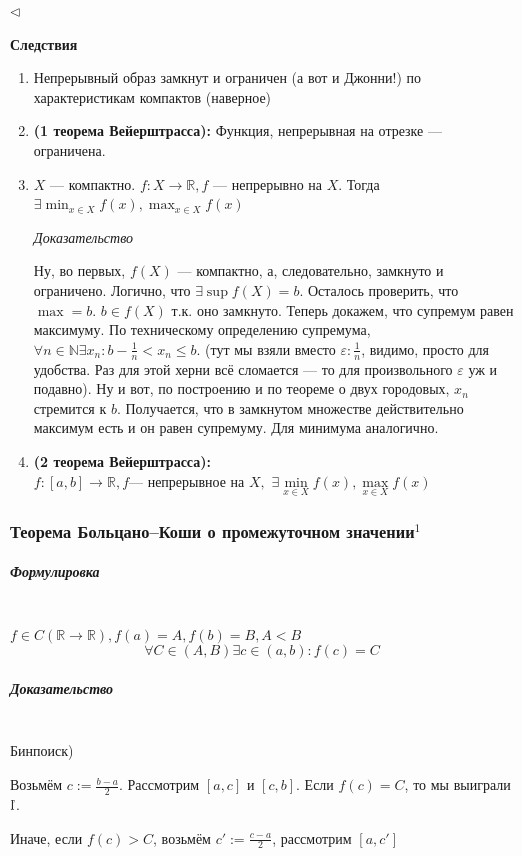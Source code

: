 \documentclass{article}
\def\dbl{\,\,}
\let\vanillasubparagraph\subparagraph
\renewcommand{\subparagraph}[1]{\vanillasubparagraph{#1}\mbox{}\\}
\begin{document}
$\lhd$

\textbf{Следствия}

\begin{enumerate}
    \item Непрерывный образ замкнут и ограничен (а вот и Джонни!) по характеристикам компактов (наверное)
    \item \textbf{(1 теорема Вейерштрасса): } Функция, непрерывная на отрезке --- ограничена.
    \item $X$ --- компактно. $f: X \rightarrow \mathbb{R}, f$ --- непрерывно на $X$. Тогда $\exists \min_{x \in X}{f(x)}, \max_{x \in X}{f(x)}$
    
    \textit{Доказательство}
    
    Ну, во первых, $f(X)$ --- компактно, а, следовательно, замкнуто и ограничено. Логично, что $\exists \sup f(X) = b$. Осталось проверить, что $\max = b$. $b \in f(X)$ т.к. оно замкнуто. Теперь докажем, что супремум равен максимуму. По техническому определению супремума, $\forall n \in \mathbb{N} \exists x_n : b - \frac{1}{n} < x_n \le b$. (тут мы взяли вместо $\varepsilon : \frac{1}{n}$, видимо, просто для удобства. Раз для этой херни всё сломается --- то для произвольного $\varepsilon$ уж и подавно). Ну и вот, по построению и по теореме о двух городовых, $x_n$ стремится к $b$. Получается, что в замкнутом множестве действительно максимум есть и он равен супремуму. Для минимума аналогично.
    
    \item \textbf{(2 теорема Вейерштрасса): }
    $f: [a, b] \rightarrow \mathbb{R}, f\text{--- непрерывное на }X,\dbl \exists \min\limits_{x \in X}{f(x)}, \max\limits_{x \in X}{f(x)}$
\end{enumerate}


\subsubsection{Теорема Больцано--Коши о промежуточном значении\texorpdfstring{$^1$}{}}
\subparagraph{Формулировка}
$f\in C(\mathbb{R} \rightarrow \mathbb{R}), f(a) = A, f(b) = B, A < B$
$$
\forall C \in (A, B) \exists c \in (a, b) : f(c) = C
$$

\subparagraph{Доказательство}
Бинпоиск)

Возьмём $c := \frac{b-a}{2}$. Рассмотрим $[a, c]$ и $[c, b]$. Если $f(c) = C$, то мы выиграли $\Smiley$.

Иначе, если $f(c) > C$, возьмём $c' := \frac{c-a}{2}$, рассмотрим $[a, c']$
\end{document}
